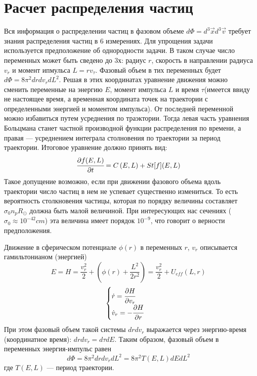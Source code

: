 \section{Расчет распределения частиц}

Вся информация о распределении частиц в фазовом объеме $d\Phi = d^{3}\vec{x}d^{3}\vec{v}$
требует знания распределения частиц в 6 измерениях. Для упрощения задачи используется
предположение об однородности задачи. В таком случае число переменных может быть сведено 
до 3х: радиус $r$, скорость в направлении радиуса $v_r$ и момент ипмульса $L = r v_{\tau}$.
Фазовый объем в тих переменных будет $d\Phi = 8\pi^{2}drdv_{r}dL^{2}$. Решая в этих
координатах уравнение движения можно сменить переменные на энергию $E$, момент 
импульса $L$ и время $\tau$(имеется ввиду не настоящее время, а временная координата точек на траектории с определенными энергией и моментом импульса). От последней переменной можно
избавиться путем усреднения по траэктории. Тогда левая часть уравнения Больцмана станет
частной производной функции распределения по времени, а правая --- усреднением интеграла столновения по траектории за период траектории. Итоговое уравнение должно принять вид:
\begin{equation}
	\label{eq:boltsman_EL}
	\cfrac{\partial f(E,L)}{\partial t} = C\left( {E,L} \right) + St\lbrack f\rbrack(E,L)
\end{equation}
Такое допущение возможно, если при движении фазового объема вдоль траектории число 
частиц в нем не успевает существенно измениться. То есть вероятность столкновения частицы,
которая по порядку величины составляет $\sigma_0 n_p R_{\odot}$ должна быть малой величиной. При интересующих нас сечениях ($\sigma_0 \approx 10^{-42} cm$) эта величина 
имеет порядок $10^{-9}$, что говорит о верности предположения.

Движение в сферическом потенциале $\phi(r)$ в переменных $r$, $v_r$ описывается гамильтонианом (энергией)
\begin{equation}
	\label{eq:move_hamiltonian}	
	E = H = \frac{v_{r}^{2}}{2} + \left( {\phi(r) + \frac{L^{2}}{2r^{2}}} \right) = \frac{v_{r}^{2}}{2} + U_{eff}(L,r)
\end{equation}
\begin{equation}
	\label{eq:move_equations}
	\begin{cases}
		\dot{r} = \cfrac{\partial H}{\partial v_r}\\
		\dot{v}_r= -\cfrac{\partial H}{\partial r}
	\end{cases}
\end{equation}
При этом фазовый объем такой системы $drdv_r$ выражается через энергию-время (координатное время): $drdv_r = d\tau dE$. Таким образом, фазовый объем в переменных энергия-импульс равен
\begin{equation}
	\label{eq:phase_volume_EL}
	d\Phi = 8\pi^{2}drdv_{r}dL^{2} = 8\pi^{2}T(E,L)dEdL^2
\end{equation}
где $T(E,L)$ --- период траектории.

